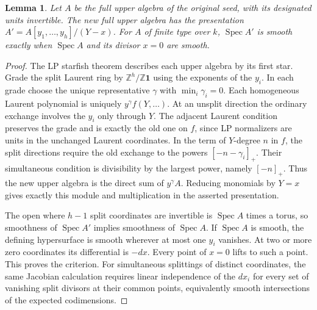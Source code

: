 \documentclass[11pt,reqno]{amsart}
\numberwithin{equation}{section}
\newtheorem{lemma}[theorem]{Lemma}
\theoremstyle{definition}
\theoremstyle{remark}
\DeclareMathOperator{\Spec}{Spec}
\begin{document}
\begin{lemma}\label{lem:split-source}
Let \(A\) be the full upper algebra of the original seed, with its
designated units invertible. The new full upper algebra has the presentation
\(A'=A[y_1,\ldots,y_h]/(Y-x)\).
For \(A\) of finite type over \(k\), \(\Spec A'\) is smooth
exactly when \(\Spec A\) and its divisor \(x=0\) are smooth.
\end{lemma}
\begin{proof}
The LP starfish theorem \cite[Theorem~1.3]{Branching} describes each
upper algebra by its first star. Grade the split Laurent ring by \(\mathbb Z^h/\mathbb Z\mathbf1\)
using the exponents of the \(y_i\). In each grade choose the unique
representative \(\gamma\) with \(\min_i\gamma_i=0\). Each homogeneous
Laurent polynomial is uniquely \(y^\gamma f(Y,\ldots)\). At an
unsplit direction the ordinary exchange involves the \(y_i\) only
through \(Y\). The adjacent Laurent condition preserves the grade
and is exactly the old one on \(f\), since LP normalizers are units in the
unchanged Laurent coordinates. In the term of \(Y\)-degree \(n\) in
\(f\), the split directions require the old exchange to the powers
\([{-n-\gamma_i}]_+\). Their simultaneous condition is divisibility
by the largest power, namely \([{-n}]_+\). Thus the new upper algebra
is the direct sum of \(y^\gamma A\). Reducing monomials by \(Y=x\)
gives exactly this module and multiplication in the asserted
presentation.

The open where \(h-1\) split coordinates are invertible is
\(\Spec A\) times a torus, so smoothness of \(\Spec A'\) implies
smoothness of \(\Spec A\). If \(\Spec A\) is smooth, the defining
hypersurface is smooth wherever at most one \(y_i\) vanishes.
At two or more zero coordinates its differential is \(-dx\). Every point of \(x=0\) lifts to such a point. This proves the
criterion. For simultaneous splittings of distinct coordinates, the same
Jacobian calculation requires linear independence of the
\(dx_i\) for every set of vanishing split divisors at their common
points, equivalently smooth intersections of the expected codimensions.
\end{proof}
\end{document}
